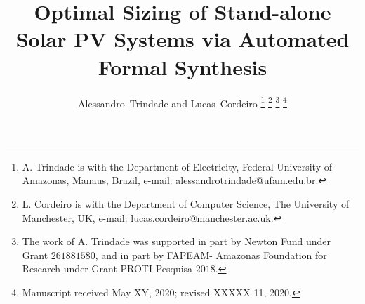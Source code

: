 \documentclass[journal]{IEEEtran}
\begin{document}
%
\title{Optimal Sizing of Stand-alone Solar PV Systems via Automated Formal Synthesis}
%
%
%

\author{Alessandro~Trindade and Lucas~Cordeiro%
\thanks{A. Trindade is with the Department of Electricity, Federal University of Amazonas, Manaus, Brazil, e-mail: alessandrotrindade@ufam.edu.br.}%
\thanks{L. Cordeiro is with the Department of Computer Science, The University of Manchester, UK, e-mail: lucas.cordeiro@manchester.ac.uk.}%
\thanks{The work of A. Trindade was supported in part by Newton Fund under Grant $261881580$, and in part by FAPEAM- Amazonas Foundation for Research under Grant PROTI-Pesquisa $2018$.}
\thanks{Manuscript received May XY, 2020; revised XXXXX 11, 2020.}}

% 
%
\end{document}
